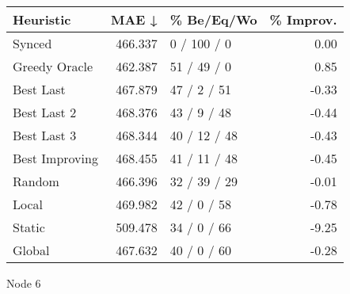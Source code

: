 \begin{tabular}{lrlr}
\toprule
\textbf{Heuristic} & \textbf{MAE ↓} & \textbf{\% Be/Eq/Wo} & \textbf{\% Improv.} \\
\midrule
            Synced &        466.337 &          0 / 100 / 0 &                0.00 \\
     Greedy Oracle &        462.387 &          51 / 49 / 0 &                0.85 \\
         Best Last &        467.879 &          47 / 2 / 51 &               -0.33 \\
       Best Last 2 &        468.376 &          43 / 9 / 48 &               -0.44 \\
       Best Last 3 &        468.344 &         40 / 12 / 48 &               -0.43 \\
    Best Improving &        468.455 &         41 / 11 / 48 &               -0.45 \\
            Random &        466.396 &         32 / 39 / 29 &               -0.01 \\
             Local &        469.982 &          42 / 0 / 58 &               -0.78 \\
            Static &        509.478 &          34 / 0 / 66 &               -9.25 \\
            Global &        467.632 &          40 / 0 / 60 &               -0.28 \\
\bottomrule
\end{tabular}
\caption{Node 6}
\label{tab:iid_lr05_le1_bs2_6}
